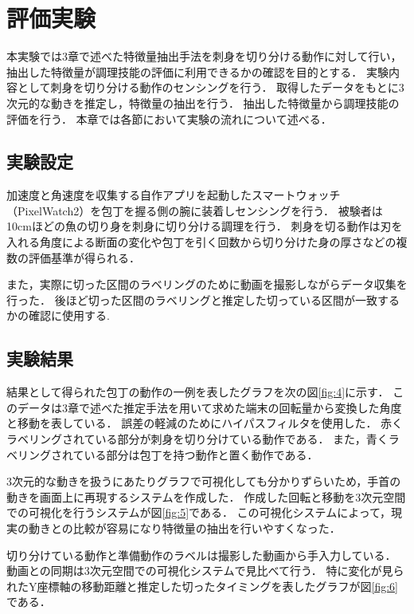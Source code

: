 \section{評価実験}
本実験では3章で述べた特徴量抽出手法を刺身を切り分ける動作に対して行い，抽出した特徴量が調理技能の評価に利用できるかの確認を目的とする．
実験内容として刺身を切り分ける動作のセンシングを行う．
取得したデータをもとに3次元的な動きを推定し，特徴量の抽出を行う．
抽出した特徴量から調理技能の評価を行う．
本章では各節において実験の流れについて述べる．
\subsection{実験設定}
加速度と角速度を収集する自作アプリを起動したスマートウォッチ（PixelWatch2）を包丁を握る側の腕に装着しセンシングを行う．
被験者は10cmほどの魚の切り身を刺身に切り分ける調理を行う．
刺身を切る動作は刃を入れる角度による断面の変化や包丁を引く回数から切り分けた身の厚さなどの複数の評価基準が得られる．

また，実際に切った区間のラベリングのために動画を撮影しながらデータ収集を行った．
後ほど切った区間のラベリングと推定した切っている区間が一致するかの確認に使用する.
\subsection{実験結果}
結果として得られた包丁の動作の一例を表したグラフを次の図\ref{fig:4}に示す．
このデータは3章で述べた推定手法を用いて求めた端末の回転量から変換した角度と移動を表している．
誤差の軽減のためにハイパスフィルタを使用した．
赤くラベリングされている部分が刺身を切り分けている動作である．
また，青くラベリングされている部分は包丁を持つ動作と置く動作である．

3次元的な動きを扱うにあたりグラフで可視化しても分かりずらいため，手首の動きを画面上に再現するシステムを作成した．
作成した回転と移動を3次元空間での可視化を行うシステムが図\ref{fig:5}である．
この可視化システムによって，現実の動きとの比較が容易になり特徴量の抽出を行いやすくなった．

切り分けている動作と準備動作のラベルは撮影した動画から手入力している．
動画との同期は3次元空間での可視化システムで見比べて行う．
特に変化が見られたY座標軸の移動距離と推定した切ったタイミングを表したグラフが図\ref{fig:6}である．


